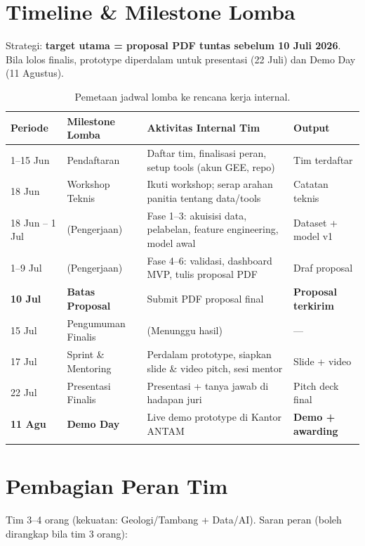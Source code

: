 \documentclass[11pt,a4paper]{article}
\begin{document}
\section{Timeline \& Milestone Lomba}
\label{sec:timeline}

Strategi: \textbf{target utama = proposal PDF tuntas sebelum 10 Juli 2026}.
Bila lolos finalis, prototype diperdalam untuk presentasi (22 Juli) dan
Demo Day (11 Agustus).

\renewcommand{\arraystretch}{1.3}
\begin{longtable}{p{2.7cm} p{3.0cm} p{6.2cm} p{2.9cm}}
\toprule
\rowcolor{softgray}
\textbf{Periode} & \textbf{Milestone Lomba} & \textbf{Aktivitas Internal Tim} & \textbf{Output} \\
\midrule
\endhead
1--15 Jun & Pendaftaran & Daftar tim, finalisasi peran, setup tools (akun GEE, repo) & Tim terdaftar \\
18 Jun & Workshop Teknis & Ikuti workshop; serap arahan panitia tentang data/tools & Catatan teknis \\
18 Jun -- 1 Jul & (Pengerjaan) & Fase 1--3: akuisisi data, pelabelan, feature engineering, model awal & Dataset + model v1 \\
1--9 Jul & (Pengerjaan) & Fase 4--6: validasi, dashboard MVP, tulis proposal PDF & Draf proposal \\
\textbf{10 Jul} & \textbf{Batas Proposal} & Submit PDF proposal final & \textbf{Proposal terkirim} \\
15 Jul & Pengumuman Finalis & (Menunggu hasil) & --- \\
17 Jul & Sprint \& Mentoring & Perdalam prototype, siapkan slide \& video pitch, sesi mentor & Slide + video \\
22 Jul & Presentasi Finalis & Presentasi + tanya jawab di hadapan juri & Pitch deck final \\
\textbf{11 Agu} & \textbf{Demo Day} & Live demo prototype di Kantor ANTAM & \textbf{Demo + awarding} \\
\bottomrule
\caption{Pemetaan jadwal lomba ke rencana kerja internal.}
\end{longtable}

\section{Pembagian Peran Tim}
\label{sec:roles}

Tim 3--4 orang (kekuatan: Geologi/Tambang + Data/AI). Saran peran
(boleh dirangkap bila tim 3 orang):
\end{document}
